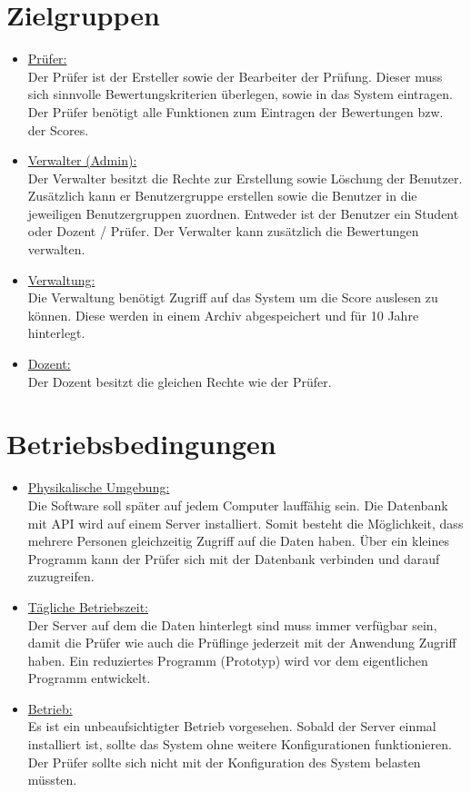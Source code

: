 \documentclass[a4paper,listof=leveldown,listof=numbered]{scrreprt}
\begin{document}
	\section{Zielgruppen}
	\begin{itemize}
		\item \underline{Prüfer:}\\
	Der Prüfer ist der Ersteller sowie der Bearbeiter der Prüfung. Dieser muss sich sinnvolle Bewertungskriterien überlegen, sowie in das System eintragen. Der Prüfer benötigt alle Funktionen zum Eintragen der Bewertungen bzw. der Scores.
	
		\item \underline{Verwalter (Admin):}\\
	Der Verwalter besitzt die Rechte zur Erstellung sowie Löschung der Benutzer. Zusätzlich kann er Benutzergruppe erstellen sowie die Benutzer in die jeweiligen Benutzergruppen zuordnen. Entweder ist der Benutzer ein Student oder Dozent / Prüfer. Der Verwalter kann zusätzlich die Bewertungen verwalten.
			
		\item \underline{Verwaltung:}\\
	Die Verwaltung benötigt Zugriff auf das System um die Score auslesen zu können. Diese werden in einem Archiv abgespeichert und für 10 Jahre hinterlegt. 	
	
	\item \underline{Dozent:}\\
	Der Dozent besitzt die gleichen Rechte wie der Prüfer.
		
	\end{itemize}

	\section{Betriebsbedingungen}
	
	\begin{itemize}
	\item \underline{Physikalische Umgebung:}\\
	Die Software soll später auf jedem Computer lauffähig sein. Die Datenbank mit API wird auf einem Server installiert. Somit besteht die Möglichkeit, dass mehrere Personen gleichzeitig Zugriff auf die Daten haben. Über ein kleines Programm kann der Prüfer sich mit der Datenbank verbinden und darauf zuzugreifen.
	
	\item \underline{Tägliche Betriebszeit:} \\
	Der Server auf dem die Daten hinterlegt sind muss immer verfügbar sein, damit die Prüfer wie auch die Prüflinge jederzeit mit der Anwendung Zugriff haben.
	Ein reduziertes Programm (Prototyp) wird vor dem eigentlichen Programm entwickelt.
		
	\item \underline{Betrieb:} \\
	Es ist ein unbeaufsichtigter Betrieb vorgesehen. Sobald der Server einmal installiert ist, sollte das System ohne weitere Konfigurationen funktionieren. Der Prüfer sollte sich nicht mit der Konfiguration des System belasten müssten. 	
	\end{itemize}
	
\end{document}
